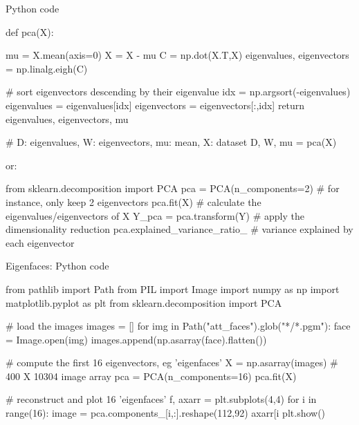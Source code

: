 \documentclass[compress]{beamer}
\begin{document}
\begin{frame}[fragile]{Python code}


\begin{pythoncode}
def pca(X):

    mu = X.mean(axis=0)
    X = X - mu
    C = np.dot(X.T,X)
    eigenvalues, eigenvectors = np.linalg.eigh(C)

    # sort eigenvectors descending by their eigenvalue
    idx = np.argsort(-eigenvalues)
    eigenvalues = eigenvalues[idx]
    eigenvectors = eigenvectors[:,idx]
    return eigenvalues, eigenvectors, mu

# D: eigenvalues, W: eigenvectors, mu: mean, X: dataset
D, W, mu = pca(X) 

\end{pythoncode}

    or:

\begin{pythoncode}
from sklearn.decomposition import PCA
pca = PCA(n_components=2) # for instance, only keep 2 eigenvectors
pca.fit(X) # calculate the eigenvalues/eigenvectors of X
Y_pca = pca.transform(Y) # apply the dimensionality reduction
pca.explained_variance_ratio_ # variance explained by each eigenvector
\end{pythoncode}
\end{frame}




\begin{frame}[fragile]{Eigenfaces: Python code}

\begin{pythoncode}
from pathlib import Path
from PIL import Image
import numpy as np
import matplotlib.pyplot as plt
from sklearn.decomposition import PCA

# load the images
images = []
for img in Path("att_faces").glob("*/*.pgm"):
    face = Image.open(img)
    images.append(np.asarray(face).flatten())

# compute the first 16 eigenvectors, eg 'eigenfaces'
X = np.asarray(images) # 400 X 10304 image array
pca = PCA(n_components=16)
pca.fit(X)

# reconstruct and plot 16 'eigenfaces'
f, axarr = plt.subplots(4,4)
for i in range(16):
    image = pca.components_[i,:].reshape(112,92)
    axarr[i%
plt.show()
\end{pythoncode}
\end{frame}
\end{document}
